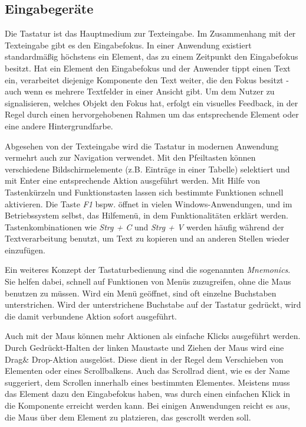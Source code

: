 \subsection{Eingabegeräte} \label{sec:inputDevices}
Die Tastatur ist das Hauptmedium zur Texteingabe. Im Zusammenhang mit der Texteingabe gibt es den Eingabefokus. In einer Anwendung existiert standardmäßig höchstens ein Element, das zu einem Zeitpunkt den Eingabefokus besitzt. Hat ein Element den Eingabefokus und der Anwender tippt einen Text ein, verarbeitet diejenige Komponente den Text weiter, die den Fokus besitzt - auch wenn es mehrere Textfelder in einer Ansicht gibt. Um dem Nutzer zu signalisieren, welches Objekt den Fokus hat, erfolgt ein visuelles Feedback, in der Regel durch einen hervorgehobenen Rahmen um das entsprechende Element oder eine andere Hintergrundfarbe.\par
Abgesehen von der Texteingabe wird die Tastatur in modernen Anwendung vermehrt auch zur Navigation verwendet. Mit den Pfeiltasten können verschiedene Bildschirmelemente (z.B. Einträge in einer Tabelle) selektiert und mit Enter eine entsprechende Aktion ausgeführt werden. Mit Hilfe von Tastenkürzeln und Funktionstasten lassen sich bestimmte Funktionen schnell aktivieren. Die Taste \textit{F1} bspw. öffnet in vielen Windows-Anwendungen, und im Betriebssystem selbst, das Hilfemenü, in dem Funktionalitäten erklärt werden. Tastenkombinationen wie \textit{Strg + C} und \textit{Strg + V} werden häufig während der Textverarbeitung benutzt, um Text zu kopieren und an anderen Stellen wieder einzufügen.\par
Ein weiteres Konzept der Tastaturbedienung sind die sogenannten \textit{Mnemonics}. Sie helfen dabei, schnell auf Funktionen von Menüs zuzugreifen, ohne die Maus benutzen zu müssen. Wird ein Menü geöffnet, sind oft einzelne Buchstaben unterstrichen. Wird der unterstrichene Buchstabe auf der Tastatur gedrückt, wird die damit verbundene Aktion sofort ausgeführt.\par
{}
Auch mit der Maus können mehr Aktionen als einfache Klicks ausgeführt werden. Durch Gedrückt-Halten der linken Maustaste und Ziehen der Maus wird eine Drag\& Drop-Aktion ausgelöst. Diese dient in der Regel dem Verschieben von Elementen oder eines Scrollbalkens. Auch das Scrollrad dient, wie es der Name suggeriert, dem Scrollen innerhalb eines bestimmten Elementes. Meistens muss das Element dazu den Eingabefokus haben, was durch einen einfachen Klick in die Komponente erreicht werden kann. Bei einigen Anwendungen reicht es aus, die Maus über dem Element zu platzieren, das gescrollt werden soll.\par
